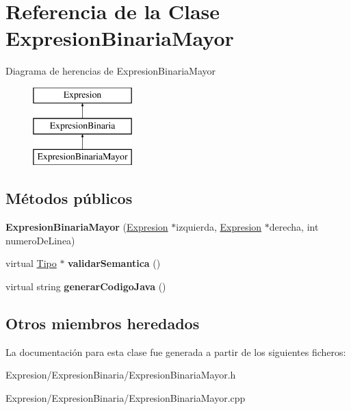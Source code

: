 \hypertarget{class_expresion_binaria_mayor}{\section{Referencia de la Clase Expresion\-Binaria\-Mayor}
\label{class_expresion_binaria_mayor}
}
Diagrama de herencias de Expresion\-Binaria\-Mayor\begin{figure}[H]
\begin{center}
\leavevmode
\includegraphics[height=3.000000cm]{class_expresion_binaria_mayor}
\end{center}
\end{figure}
\subsection*{Métodos públicos}
\begin{DoxyCompactItemize}
\item 
\hypertarget{class_expresion_binaria_mayor_acee27dbbe3bada9df7f94258f0f51b11}{{\bfseries Expresion\-Binaria\-Mayor} (\hyperlink{class_expresion}{Expresion} $\ast$izquierda, \hyperlink{class_expresion}{Expresion} $\ast$derecha, int numero\-De\-Linea)}\label{class_expresion_binaria_mayor_acee27dbbe3bada9df7f94258f0f51b11}

\item 
\hypertarget{class_expresion_binaria_mayor_a118356acb5b822ca9b19050550166f0e}{virtual \hyperlink{class_tipo}{Tipo} $\ast$ {\bfseries validar\-Semantica} ()}\label{class_expresion_binaria_mayor_a118356acb5b822ca9b19050550166f0e}

\item 
\hypertarget{class_expresion_binaria_mayor_aa60f0341ead7df4cdde8aaa534546892}{virtual string {\bfseries generar\-Codigo\-Java} ()}\label{class_expresion_binaria_mayor_aa60f0341ead7df4cdde8aaa534546892}

\end{DoxyCompactItemize}
\subsection*{Otros miembros heredados}


La documentación para esta clase fue generada a partir de los siguientes ficheros\-:\begin{DoxyCompactItemize}
\item 
Expresion/\-Expresion\-Binaria/Expresion\-Binaria\-Mayor.\-h\item 
Expresion/\-Expresion\-Binaria/Expresion\-Binaria\-Mayor.\-cpp\end{DoxyCompactItemize}
